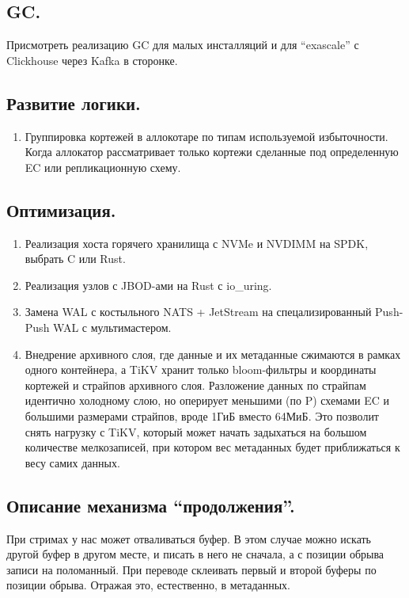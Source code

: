 \documentclass[a4paper,12pt]{article}
\begin{document}
\subsection{GC.}

Присмотреть реализацию GC для малых инсталляций и для \enquote{exascale} с Clickhouse через Kafka в сторонке.

\subsection{Развитие логики.}
\begin{enumerate}
\item Группировка кортежей в аллокотаре по типам используемой избыточности. Когда аллокатор рассматривает только
кортежи сделанные под определенную EC или репликационную схему.
\end{enumerate}

\subsection{Оптимизация.}
\begin{enumerate}
    \item Реализация хоста горячего хранилища с NVMe и NVDIMM на SPDK, выбрать C или Rust.
    \item Реализация узлов с JBOD-ами на Rust с io\_uring.
    \item Замена WAL с костыльного NATS + JetStream на спецализированный Push-Push WAL с мультимастером.
    \item Внедрение архивного слоя, где данные и их метаданные сжимаются в рамках одного контейнера, а TiKV хранит только bloom-фильтры и координаты
    кортежей и страйпов архивного слоя. Разложение данных по страйпам идентично холодному слою, но оперирует меньшими (по P) схемами EC и большими
    размерами страйпов, вроде 1ГиБ вместо 64МиБ. Это позволит снять нагрузку с TiKV, который может начать задыхаться на большом количестве мелкозаписей,
    при котором вес метаданных будет приближаться к весу самих данных.
\end{enumerate}

\subsection{Описание механизма \enquote{продолжения}.}

При стримах у нас может отваливаться буфер. В этом случае можно искать другой буфер в другом месте, и писать в него не сначала, а с позиции обрыва записи на поломанный.
При переводе склеивать первый и второй буферы по позиции обрыва. Отражая это, естественно, в метаданных.
\end{document}
